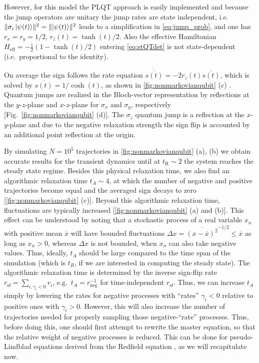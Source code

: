 \documentclass[twocolumn,prl,superscriptaddress]{revtex4-2}
\begin{document}
However, for this model the PLQT approach is easily implemented and because the jump operators are unitary the jump rates are state independent, i.e.~$\lVert \sigma_i \ket{\psi(t)} \rVert^2 = \lVert \ket{\psi(t)} \rVert^2$ leads to a simplification in \cref{eq:jump_prob}, and one has $r_x=r_y=1/2$, $r_z(t)=\tanh(t)/2$. Also the effective Hamiltonian $H_\mathrm{eff} = - \frac{\mathrm i}{2} (1 - \tanh(t)/2)$ entering \cref{eq:stQTdet} is not state-dependent (i.e.~proportional to the identity).

On average the sign follows the rate equation $\dot{\overline{s(t)}} = -2r_z(t) \overline{s(t)}$, which is solved by $\overline{s(t)} = 1/\cosh(t)$, as shown in \cref{fig:nonmarkovianqubit} (c) \cite{supp_TBeckerCNetzerAEckardt2023}. Quantum jumps are realized in the Bloch-vector representation by reflections at the $y$-$z$-plane and $x$-$z$-plane for $\sigma_x$ and $\sigma_y$, respectively [Fig.~\ref{fig:nonmarkovianqubit} (d)]. The $\sigma_z$ quantum jump is a reflection at the $x$-$y$-plane and due to the negative relaxation strength the sign flip is accounted by an additional point reflection at the origin. 

By simulating $N=10^5$ trajectories in \cref{fig:nonmarkovianqubit} (a), (b) we obtain accurate results for the transient dynamics until at $t_\mathrm{R}\sim 2$ the system reaches the steady state regime. Besides this physical relaxation time, we also find an algorithmic relaxation time $t_A \sim 4$, at which the number of negative and positive trajectories become equal and the averaged sign decays to zero [\cref{fig:nonmarkovianqubit} (c)]. Beyond this algorithmic relaxation time, fluctuations are typically increased [\cref{fig:nonmarkovianqubit} (a) and (b)]. This effect can be understood by noting that a stochastic process of a real variable $x_n$ with positive mean $\overline{x}$ will have  bounded fluctuations $\Delta x = \overline{(x-\overline{x})^2}^{-1/2}\leq \overline{x}$ as long as $x_n>0$, whereas $\Delta x$ is not bounded, when $x_n$ can also take negative values. Thus, ideally, $t_A$ should be large compared to the time span of the simulation (which is $t_R$, if we are interested in computing the steady state). The algorithmic relaxation time is determined by the inverse sign-flip rate $r_\text{sf}=\sum_{i,\gamma_i<0} r_i$, e.g.~$t_A =r_\text{neg}^{-1}$ for time-independent $r_\text{sf}$. Thus, we can increase $t_A$ simply by lowering the rates for negative processes with “rates” $\gamma_i<0$ relative to positive ones with $\gamma_i>0$. However, this will also increase the number of trajectories needed for properly sampling those negative-“rate” processes. Thus, before doing this, one should first attempt to rewrite the master equation, so that the relative weight of negative processes is reduced. This can be done for pseudo-Lindblad equations derived from the Redfield equation \cite{TBecker2021}, as we will recapitulate now.
\end{document}
